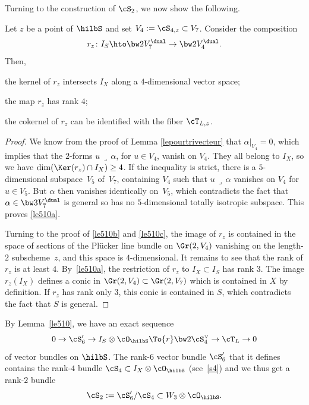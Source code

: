 Turning to the construction of
$\cS_2$, we now show the following.

\begin{lemm} \label{le510}
Let $z$ be a point of $\hilbS$ and set
$V_4:=\cS_{4,z}\subset V_7$. Consider the composition
\[
r_z\colon I_S\hto \bw2V_7^\dual\to \bw2V_4^\dual.
\]
Then,
\begin{enumeratea}
\item\label{le510a}
the kernel of $r_z$ intersects $I_X$ along a $4$-dimensional vector
space;
\item\label{le510b}
the map
$r_z$ has rank $4$;
\item\label{le510c}
the cokernel of
$r_z$ can be identified with the fiber $\cT_{L,z}$.
\end{enumeratea}
\end{lemm}

\begin{proof} We know from the proof of Lemma \ref{lepourtrivecteur}
that $\alpha\vert_{V_4}=0$, which implies that the $2$-forms
$u\,\lrcorner\,\alpha$, for $u\in V_4$, vanish on $V_4$. They all belong to $I_X$, so we have
$\dim (\Ker (r_z)\cap I_X)\geq 4$. If the inequality is strict, there is a $5$-dimensional subspace~$V_5$ of~$V_7$, containing $V_4$ such that $u\,\lrcorner\,\alpha$ vanishes on $V_4$ for $u\in V_5$. But
$\alpha$ then vanishes identically on~$V_5$, which contradicts the fact that $\alpha\in \bw3 V_7^\dual$ is general so has no
$5$-dimensional totally isotropic subspace. This proves \eqref{le510a}.

Turning to the proof of \eqref{le510b} and \eqref{le510c}, the image of $r_z$ is contained in the space of sections of the Plücker line bundle on $\Gr(2,V_4)$ vanishing on the length-$2$ subscheme~$z$, and this space is $4$-dimensional. It remains to see that the rank of $r_z$ is at least $4$.
By~\eqref{le510a}, the restriction of $r_z$ to $I_X\subset I_S$ has rank $3$. The image $r_z(I_X)$ defines a conic in
$\Gr(2,V_4 )\subset \Gr(2,V_7 )$ which is contained in $X$ by definition.
If $r_z$ has rank only $3$,
this conic is contained in $S$, which contradicts the fact that $S$ is general.
\end{proof}

By Lemma~\ref{le510}, we have an exact sequence
\begin{equation}\label{eq20}
0\to \cS'_6\to I_S\otimes \cO_{\hilbS}\To{r} \bw2\cS_4^\vee
\to \cT_{L}\to 0
\end{equation}
of vector bundles on $\hilbS$. The rank-$6$ vector bundle $\cS'_6$ that it defines
contains the rank-$4$ bundle
$\cS_4\subset I_X\otimes \cO_{\hilbS}$ (see~\eqref{s4}) and we thus get a rank-$2$
bundle
\[
\cS_2:=\cS'_6/\cS_4\subset W_3\otimes \cO_{\hilbS}.
\]

